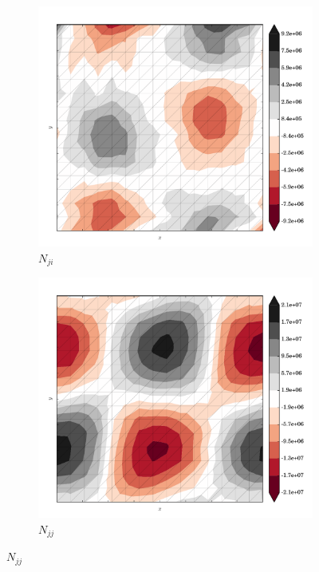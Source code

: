 \begin{figure}
  \begin{subfigure}[b]{0.3\linewidth}
    \includegraphics[width=\linewidth]{images/stress_balance/RS/N_ji.pdf}
  \caption{$N_{ji}$}
  \label{rs_N_ji}
  \end{subfigure}
  \begin{subfigure}[b]{0.3\linewidth}
    \includegraphics[width=\linewidth]{images/stress_balance/RS/N_jj.pdf}
  \caption{$N_{jj}$}
  \label{rs_N_jj}
  \end{subfigure}

\end{figure}
